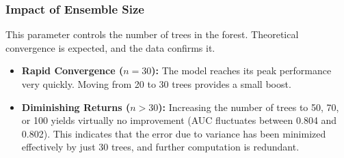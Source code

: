 \documentclass[12pt,a4paper]{article}
\begin{document}
\begin{table}[h!]
\centering
{}
\caption{Impact of Depth on Stability ($n\_estimators=30$)}
\end{table}

\subsubsection*{Impact of Ensemble Size}
This parameter controls the number of trees in the forest. Theoretical convergence is expected, and the data confirms it.

\begin{itemize}
    \item \textbf{Rapid Convergence ($n=30$):} The model reaches its peak performance very quickly. Moving from 20 to 30 trees provides a small boost.
    \item \textbf{Diminishing Returns ($n > 30$):} Increasing the number of trees to 50, 70, or 100 yields virtually no improvement (AUC fluctuates between 0.804 and 0.802). This indicates that the error due to variance has been minimized effectively by just 30 trees, and further computation is redundant.
\end{itemize}
\end{document}

